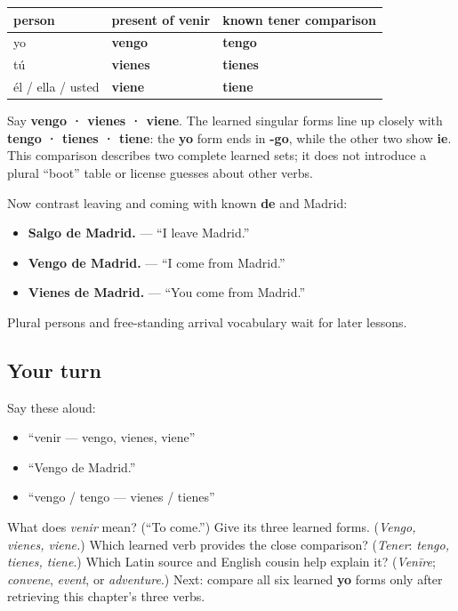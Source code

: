 \begin{grammarlens}[title={Grammar Lens: one known comparison, still singular}]
\noindent
\begin{tabularx}{\linewidth}{@{}>{\raggedright\arraybackslash}X>{\raggedright\arraybackslash}X>{\raggedright\arraybackslash}X@{}}
\toprule
\textbf{person} & \textbf{present of \textbf{venir}} & \textbf{known \textbf{tener} comparison} \\
\midrule
yo & \textbf{vengo} & \textbf{tengo} \\
tú & \textbf{vienes} & \textbf{tienes} \\
él / ella / usted & \textbf{viene} & \textbf{tiene} \\
\bottomrule
\end{tabularx}

Say \textbf{vengo · vienes · viene}. The learned singular forms line up closely with \textbf{tengo · tienes · tiene}: the \textbf{yo} form ends in \textbf{-go}, while the other two show \textbf{ie}. This comparison describes two complete learned sets; it does not introduce a plural “boot” table or license guesses about other verbs.

Now contrast leaving and coming with known \textbf{de} and Madrid:

\begin{itemize}
\raggedright
  \item \textbf{Salgo de Madrid.} — “I leave Madrid.”
  \item \textbf{Vengo de Madrid.} — “I come from Madrid.”
  \item \textbf{Vienes de Madrid.} — “You come from Madrid.”
\end{itemize}

Plural persons and free-standing arrival vocabulary wait for later lessons.
\end{grammarlens}

\subsection*{Your turn}
Say these aloud:

\begin{itemize}
\raggedright
  \item “venir — vengo, vienes, viene”
  \item “Vengo de Madrid.”
  \item “vengo / tengo — vienes / tienes”
\end{itemize}

\begin{tcolorbox}[breakable,colback=teal!4,colframe=teal!35!black,title={Before you move on}]
What does \emph{venir} mean? (“To come.”) Give its three learned forms. (\emph{Vengo, vienes, viene.}) Which learned verb provides the close comparison? (\emph{Tener}: \emph{tengo, tienes, tiene}.) Which Latin source and English cousin help explain it? (\emph{Venīre}; \emph{convene}, \emph{event}, or \emph{adventure}.) Next: compare all six learned \textbf{yo} forms only after retrieving this chapter's three verbs.
\end{tcolorbox}
